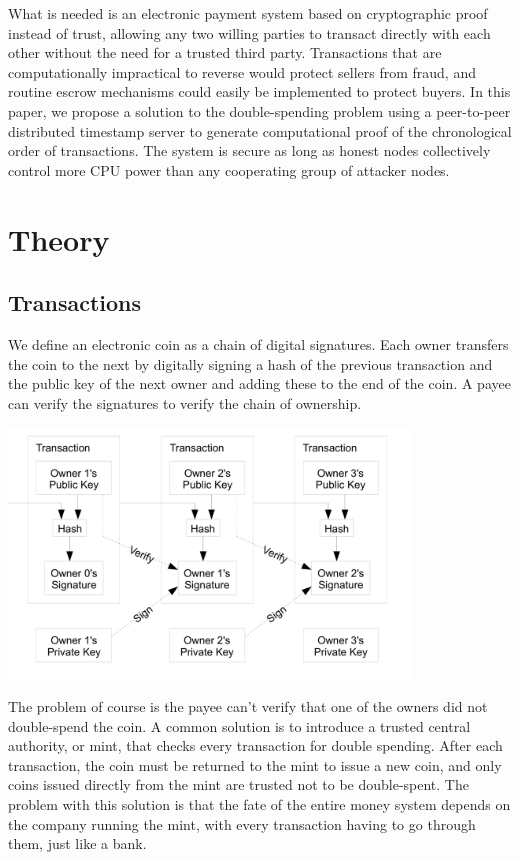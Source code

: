 \documentclass[10pt]{book}
\begin{document}
What is needed is an electronic payment system based on cryptographic proof instead of trust, allowing any two willing parties to transact directly with each other without the need for a trusted third party.
Transactions that are computationally impractical to reverse would protect sellers from fraud, and routine escrow mechanisms could easily be implemented to protect buyers.
In this paper, we propose a solution to the double-spending problem using a peer-to-peer distributed timestamp server to generate computational proof of the chronological order of transactions.
The system is secure as long as honest nodes collectively control more CPU power than any cooperating group of attacker nodes.

\part{Theory}
\chapter{Transactions}
We define an electronic coin as a chain of digital signatures.
Each owner transfers the coin to the next by digitally signing a hash of the previous transaction and the public key of the next owner and adding these to the end of the coin.
A payee can verify the signatures to verify the chain of ownership.

\begin{center}
\includegraphics[width=0.8\textwidth]{./images/1.png}
\end{center}

The problem of course is the payee can't verify that one of the owners did not double-spend the coin.
A common solution is to introduce a trusted central authority, or mint, that checks every transaction for double spending.
After each transaction, the coin must be returned to the mint to issue a new coin, and only coins issued directly from the mint are trusted not to be double-spent.
The problem with this solution is that the fate of the entire money system depends on the company running the mint, with every transaction having to go through them, just like a bank.
\end{document}
